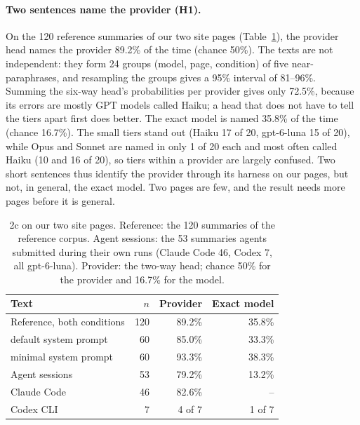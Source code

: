 
\paragraph{Two sentences name the provider (H1).} On the 120 reference summaries of our two site pages
(Table~\ref{tab:model}), the provider head names the provider 89.2\% of the time (chance 50\%). The
texts are not independent: they form 24 groups (model, page, condition) of five near-paraphrases, and
resampling the groups gives a 95\% interval of 81--96\%. Summing the six-way head's probabilities per
provider gives only 72.5\%, because its errors are mostly GPT models called Haiku; a head that does not
have to tell the tiers apart first does better. The exact model is named 35.8\% of the time (chance
16.7\%). The small tiers stand out (Haiku 17 of 20, gpt-6-luna 15 of 20), while Opus and Sonnet are
named in only 1 of 20 each and most often called Haiku (10 and 16 of 20), so tiers within a provider
are largely confused. Two short
sentences thus identify the provider through its harness on our pages, but not, in general, the exact
model. Two pages are few, and the result needs more pages before it is general.

\begin{table}[t]
  \centering
  \caption{2c on our two site pages. Reference: the 120 summaries of the reference corpus. Agent
  sessions: the 53 summaries agents submitted during their own runs (Claude Code 46, Codex 7, all
  gpt-6-luna). Provider: the two-way head; chance 50\% for the provider and 16.7\% for the model.}
  \label{tab:model}
  \begin{tabular}{lrrr}
    \toprule
    Text & $n$ & Provider & Exact model \\
    \midrule
    Reference, both conditions & 120 & 89.2\% & 35.8\% \\
    \quad default system prompt & 60 & 85.0\% & 33.3\% \\
    \quad minimal system prompt & 60 & 93.3\% & 38.3\% \\
    Agent sessions & 53 & 79.2\% & 13.2\% \\
    \quad Claude Code & 46 & 82.6\% & -- \\
    \quad Codex CLI & 7 & 4 of 7 & 1 of 7 \\
    \bottomrule
  \end{tabular}
\end{table}

